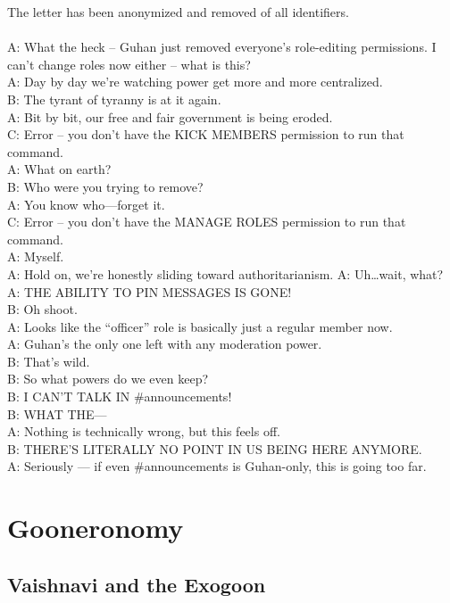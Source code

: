 \documentclass{article}
\begin{document}
The letter has been anonymized and removed of all identifiers.
\\ \\
A: What the heck -- Guhan just removed everyone’s role-editing permissions. I can’t change roles now either -- what is this? \\
A: Day by day we’re watching power get more and more centralized.\\
B: The tyrant of tyranny is at it again.\\
A: Bit by bit, our free and fair government is being eroded.\\
C: Error – you don’t have the KICK MEMBERS permission to run that command.\\
A: What on earth?\\
B: Who were you trying to remove?\\
A: You know who—forget it.\\
C: Error – you don’t have the MANAGE ROLES permission to run that command.\\
A: Myself.\\
A: Hold on, we’re honestly sliding toward authoritarianism.
A: Uh…wait, what?\\
A: THE ABILITY TO PIN MESSAGES IS GONE!\\
B: Oh shoot.\\
A: Looks like the “officer” role is basically just a regular member now.\\
A: Guhan’s the only one left with any moderation power.\\
B: That’s wild.\\
B: So what powers do we even keep?\\
B: I CAN’T TALK IN \#announcements!\\
B: WHAT THE—\\
A: Nothing is technically wrong, but this feels off.\\
B: THERE’S LITERALLY NO POINT IN US BEING HERE ANYMORE.\\
A: Seriously --- if even \#announcements is Guhan-only, this is going too far.

\section{Gooneronomy}

\subsection{Vaishnavi and the Exogoon}
\end{document}
